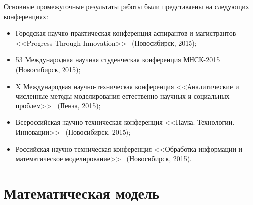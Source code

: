 \documentclass[a4paper,14pt]{article}
\makeatletter
\newcommand{\labelname}[1]{%
	\def\@currentlabelname{#1}}%
\makeatother
\begin{document}
\pagebreak

Основные промежуточные результаты работы были представлены на следующих конференциях:
\begin{itemize}
	\item Городская научно-практическая конференция аспирантов и магистрантов <<Progress Through Innovation>>~\citep{conf_english_2015} (Новосибирск, 2015);
	\item 53 Международная научная студенческая конференция МНСК-2015~\citep{conf_mnsk_academ_2015} (Новосибирск, 2015);
	\item X Международная научно-техническая конференция <<Аналитические и численные методы моделирования естественно-научных и социальных проблем>>~\citep{conf_achm_2015} (Пенза, 2015);
	\item Всероссийская научно-техническая конференция <<Наука. Технологии. Инновации>>~\citep{conf_nti_2015} (Новосибирск, 2015);
	\item Российская научно-техническая конференция <<Обработка информации и математическое моделирование>>~\citep{conf_radio_day_2015} (Новосибирск, 2015).
\end{itemize}



\clearpage
\section{Математическая модель}
\labelname{1}\label{sec:math_model}
\end{document}
